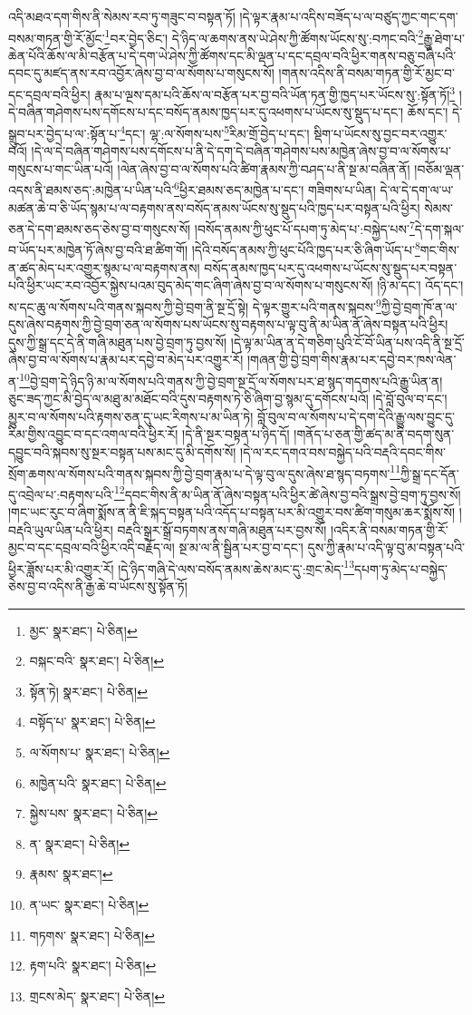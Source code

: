 འདི་མཐའ་དག་གིས་ནི་སེམས་རབ་ཏུ་གཟུང་བ་བསྟན་ཏོ། །དེ་ལྟར་རྣམ་པ་འདིས་བཟོད་པ་ལ་བཙུད་ཀྱང་གང་དག་བསམ་གཏན་གྱི་རོ་མྱོང་\footnote{མྱང་  སྣར་ཐང་།  པེ་ཅིན། }བར་བྱེད་ཅིང་། དེ་ཉིད་ལ་ཆགས་ནས་ཡེ་ཤེས་ཀྱི་ཚོགས་ཡོངས་སུ་:བཀང་བའི་\footnote{བསྐང་བའི་  སྣར་ཐང་།  པེ་ཅིན། }རྒྱུ་ཐེག་པ་ཆེན་པོའི་ཆོས་ལ་མི་བརྩོན་པ་དེ་དག་ཡེ་ཤེས་ཀྱི་ཚོགས་དང་མི་ལྡན་པ་དང་དབྲལ་བའི་ཕྱིར་གནས་བཅུ་བཞི་པའི་དབང་དུ་མཛད་ནས་རབ་འབྱོར་ཞེས་བྱ་བ་ལ་སོགས་པ་གསུངས་སོ། །གནས་འདིས་ནི་བསམ་གཏན་གྱི་རོ་མྱང་བ་དང་དབྲལ་བའི་ཕྱིར། རྣམ་པ་ལྔས་དམ་པའི་ཆོས་ལ་བརྩོན་པར་བྱ་བའི་ཡོན་ཏན་གྱི་ཁྱད་པར་ཡོངས་སུ་:སྟོན་ཏོ།\footnote{སྟོན་ཏེ།  སྣར་ཐང་།  པེ་ཅིན། } །དེ་བཞིན་གཤེགས་པས་དགོངས་པ་དང་བསོད་ནམས་ཁྱད་པར་དུ་འཕགས་པ་ཡོངས་སུ་སྡུད་པ་དང་། ཆོས་དང་། དེ་སྒྲུབ་པར་བྱེད་པ་ལ་:སྟོན་པ་\footnote{བསྟོད་པ་  སྣར་ཐང་།  པེ་ཅིན། }དང་། ལྷ་:ལ་སོགས་པས་\footnote{ལ་སོགས་པ་  སྣར་ཐང་།  པེ་ཅིན། }རིམ་གྲོ་བྱེད་པ་དང་། སྡིག་པ་ཡོངས་སུ་བྱང་བར་འགྱུར་བའོ། །དེ་ལ་དེ་བཞིན་གཤེགས་པས་དགོངས་པ་ནི་དེ་དག་དེ་བཞིན་གཤེགས་པས་མཁྱེན་ཞེས་བྱ་བ་ལ་སོགས་པ་གསུངས་པ་གང་ཡིན་པའོ། །ལེན་ཞེས་བྱ་བ་ལ་སོགས་པའི་ཚིག་རྣམས་ཀྱི་བཤད་པ་ནི་སྔ་མ་བཞིན་ནོ། །བཅོམ་ལྡན་འདས་ནི་ཐམས་ཅད་:མཁྱེན་པ་ཡིན་པའི་\footnote{མཁྱེན་པའི་  སྣར་ཐང་།  པེ་ཅིན། }ཕྱིར་ཐམས་ཅད་མཁྱེན་པ་དང་། གཟིགས་པ་ཡིན། དེ་ལ་དེ་དག་ལ་ཡ་མཚན་ཆེ་བ་ཅི་ཡོད་སྙམ་པ་ལ་བརྟགས་ནས་བསོད་ནམས་ཡོངས་སུ་སྡུད་པའི་ཁྱད་པར་བསྟན་པའི་ཕྱིར། སེམས་ཅན་དེ་དག་ཐམས་ཅད་ཅེས་བྱ་བ་གསུངས་སོ། །བསོད་ནམས་ཀྱི་ཕུང་པོ་དཔག་ཏུ་མེད་པ་:བསྐྱེད་པས་\footnote{སྐྱེས་པས་  སྣར་ཐང་།  པེ་ཅིན། }དེ་དག་སྐལ་བ་ཡོད་པར་མཁྱེན་ཏོ་ཞེས་བྱ་བའི་ཐ་ཚིག་གོ། །དེའི་བསོད་ནམས་ཀྱི་ཕུང་པོའི་ཁྱད་པར་ཅི་ཞིག་ཡོད་པ་\footnote{ན་  སྣར་ཐང་།  པེ་ཅིན། }གང་གིས་ན་ཚད་མེད་པར་འགྱུར་སྙམ་པ་ལ་བརྟགས་ནས། བསོད་ནམས་ཁྱད་པར་དུ་འཕགས་པ་ཡོངས་སུ་སྡུད་པར་བསྟན་པའི་ཕྱིར་ཡང་རབ་འབྱོར་སྐྱེས་པའམ་བུད་མེད་གང་ཞིག་ཞེས་བྱ་བ་ལ་སོགས་པ་གསུངས་སོ། །ཉི་མ་དང་། འོད་དང་། ས་དང་ཆུ་ལ་སོགས་པའི་གནས་སྐབས་ཀྱི་བྱེ་བྲག་ནི་སྔ་དྲོ་སྟེ། དེ་ལྟར་གྱུར་པའི་གནས་སྐབས་\footnote{རྣམས་  སྣར་ཐང་། }ཀྱི་བྱེ་བྲག་ཁོ་ན་ལ་དུས་ཞེས་བརྟགས་ཀྱི་བྱེ་བྲག་ཅན་ལ་སོགས་པས་ཡོངས་སུ་བརྟགས་པ་ལྟ་བུ་ནི་མ་ཡིན་ནོ་ཞེས་བསྟན་པའི་ཕྱིར། དུས་ཀྱི་སྒྲ་དང་དེ་ནི་གཞི་མཐུན་པས་བྱེ་བྲག་ཏུ་བྱས་སོ། །དེ་ལྟ་མ་ཡིན་ན་དེ་གཅིག་པུའི་ངོ་བོ་ཡིན་པས་འདི་ནི་སྔ་དྲོ་ཞེས་བྱ་བ་ལ་སོགས་པ་རྣམ་པར་དབྱེ་བ་མེད་པར་འགྱུར་རོ། །གཞན་གྱི་བྱེ་བྲག་གིས་རྣམ་པར་དབྱེ་བར་ཁས་ལེན་ན་\footnote{ན་ཡང་  སྣར་ཐང་།  པེ་ཅིན། }བྱེ་བྲག་དེ་ཉིད་ཉི་མ་ལ་སོགས་པའི་གནས་ཀྱི་བྱེ་བྲག་སྔ་དྲོ་ལ་སོགས་པར་ཐ་སྙད་གདགས་པའི་རྒྱུ་ཡིན་ན། ཅུང་ཟད་ཀྱང་མི་བྱེད་ལ་མཐུ་མ་མཐོང་བའི་དུས་བརྟགས་ཏེ་ཅི་ཞིག་བྱ་སྙམ་དུ་དགོངས་པའོ། །དེ་བློ་བུལ་བ་དང་། མྱུར་བ་ལ་སོགས་པའི་རྟགས་ཅན་དུ་ཡང་རིགས་པ་མ་ཡིན་ཏེ། བློ་བུལ་བ་ལ་སོགས་པ་དེ་དག་དེའི་རྒྱུ་ལས་བྱུང་དུ་རིམ་གྱིས་འབྱུང་བ་དང་འགལ་བའི་ཕྱིར་རོ། །དེ་ནི་སྔར་བསྟན་པ་ཉིད་དོ། །གནོད་པ་ཅན་གྱི་ཚད་མ་ནི་བདག་སུན་དབྱུང་བའི་སྐབས་སུ་སྔར་བསྟན་པས་མང་དུ་མི་དགོས་སོ། །དེ་ལ་རང་དགའ་བས་བསྐྱེད་པའི་བརྡའི་དབང་གིས་སྲོག་ཆགས་ལ་སོགས་པའི་གནས་སྐབས་ཀྱི་བྱེ་བྲག་རྣམ་པ་དེ་ལྟ་བུ་ལ་དུས་ཞེས་ཐ་སྙད་བཏགས་\footnote{གཏགས་  སྣར་ཐང་།  པེ་ཅིན། }ཀྱི་སྒྲ་དང་དོན་དུ་འབྲེལ་པ་:བརྟགས་པའི་\footnote{རྟག་པའི་  སྣར་ཐང་།  པེ་ཅིན། }དབང་གིས་ནི་མ་ཡིན་ནོ་ཞེས་བསྟན་པའི་ཕྱིར་ཚེ་ཞེས་བྱ་བའི་སྒྲས་བྱེ་བྲག་ཏུ་བྱས་སོ། །གང་ཡང་རུང་བ་ཞིག་སྨོས་ན་ནི་ཇི་སྐད་བསྟན་པའི་འདོད་པ་བསྟན་པར་མི་འགྱུར་བས་ཚིག་གསུམ་ཆར་སྨོས་སོ། །བརྡའི་ཡུལ་ཡིན་པའི་ཕྱིར། བརྡའི་སྒྲར་སྒྲོ་བཏགས་ནས་གཞི་མཐུན་པར་བྱས་སོ། །འདིར་ནི་བསམ་གཏན་གྱི་རོ་མྱང་བ་དང་དབྲལ་བའི་ཕྱིར་འདི་བརྗོད་ལ། སྔ་མ་ལ་ནི་སྦྱིན་པར་བྱ་བ་དང་། དུས་ཀྱི་རྣམ་པ་འདི་ལྟ་བུ་མ་བསྟན་པའི་ཕྱིར་ཟློས་པར་མི་འགྱུར་རོ། །དེ་ཉིད་གཞི་དེ་ལས་བསོད་ནམས་ཆེས་མང་དུ་:གྲང་མེད་\footnote{གྲངས་མེད་  སྣར་ཐང་།  པེ་ཅིན། }དཔག་ཏུ་མེད་པ་བསྐྱེད་ཅེས་བྱ་བ་འདིས་ནི་རྒྱ་ཆེ་བ་ཡོངས་སུ་སྟོན་ཏོ། 